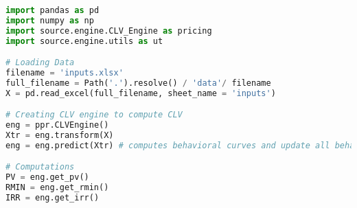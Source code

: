 
\begin{lstlisting}[language=Python, caption=Python API]
import pandas as pd
import numpy as np
import source.engine.CLV_Engine as pricing
import source.engine.utils as ut

# Loading Data
filename = 'inputs.xlsx'
full_filename = Path('.').resolve() / 'data'/ filename
X = pd.read_excel(full_filename, sheet_name = 'inputs')

# Creating CLV engine to compute CLV   
eng = ppr.CLVEngine()
Xtr = eng.transform(X) 
eng = eng.predict(Xtr) # computes behavioral curves and update all behavioral curves

# Computations
PV = eng.get_pv()
RMIN = eng.get_rmin()
IRR = eng.get_irr()


\end{lstlisting}